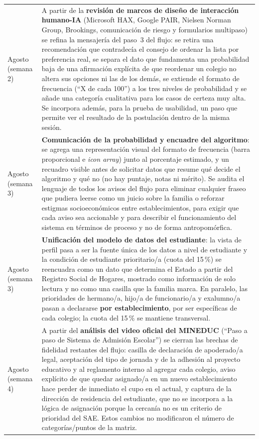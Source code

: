 {\begin{longtable}{p{2.2cm}p{9.5cm}}
Agosto (semana 2) & A partir de la \textbf{revisión de marcos de diseño de interacción humano-IA} (Microsoft HAX, Google PAIR, Nielsen Norman Group, Brookings, comunicación de riesgo y formularios multipaso) se refina la mensajería del paso~3 del flujo: se retira una recomendación que contradecía el consejo de ordenar la lista por preferencia real, se separa el dato que fundamenta una probabilidad baja de una afirmación explícita de que reordenar un colegio no altera sus opciones ni las de los demás, se extiende el formato de frecuencia (``X de cada 100'') a los tres niveles de probabilidad y se añade una categoría cualitativa para los casos de certeza muy alta. Se incorpora además, para la prueba de usabilidad, un paso que permite ver el resultado de la postulación dentro de la misma sesión. \\
Agosto (semana 3) & \textbf{Comunicación de la probabilidad y encuadre del algoritmo}: se agrega una representación visual del formato de frecuencia (barra proporcional e \emph{icon array}) junto al porcentaje estimado, y un recuadro visible antes de solicitar datos que resume qué decide el algoritmo y qué no (no hay puntaje, notas ni mérito). Se audita el lenguaje de todos los avisos del flujo para eliminar cualquier fraseo que pudiera leerse como un juicio sobre la familia o reforzar estigmas socioeconómicos entre establecimientos, para exigir que cada aviso sea accionable y para describir el funcionamiento del sistema en términos de proceso y no de forma antropomórfica. \\
Agosto (semana 3) & \textbf{Unificación del modelo de datos del estudiante}: la vista de perfil pasa a ser la fuente única de los datos a nivel de estudiante y la condición de estudiante prioritario/a (cuota del 15\,\%) se reencuadra como un dato que determina el Estado a partir del Registro Social de Hogares, mostrado como información de solo lectura y no como una casilla que la familia marca. En paralelo, las prioridades de hermano/a, hijo/a de funcionario/a y exalumno/a pasan a declararse \textbf{por establecimiento}, por ser específicas de cada colegio; la cuota del 15\,\% se mantiene transversal. \\
Agosto (semana 4) & A partir del \textbf{análisis del video oficial del MINEDUC} (``Paso a paso de Sistema de Admisión Escolar'') se cierran las brechas de fidelidad restantes del flujo: casilla de declaración de apoderado/a legal, aceptación del tipo de jornada y de la adhesión al proyecto educativo y al reglamento interno al agregar cada colegio, aviso explícito de que quedar asignado/a en un nuevo establecimiento hace perder de inmediato el cupo en el actual, y captura de la dirección de residencia del estudiante, que no se incorpora a la lógica de asignación porque la cercanía no es un criterio de prioridad del SAE. Estos cambios no modificaron el número de categorías/puntos de la matriz. \\

\end{longtable}}
